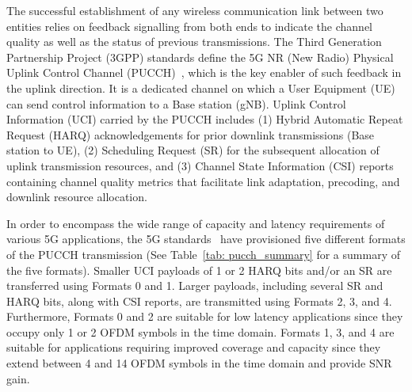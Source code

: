 \documentclass[journal]{IEEEtran}
\begin{document}
The successful establishment of any wireless communication link between two entities relies on feedback signalling from both ends to indicate the channel quality as well as the status of previous transmissions. The Third Generation Partnership Project (3GPP) standards define the 5G NR (New Radio) Physical Uplink Control Channel (PUCCH)~\cite{5g_bullets}, which is the key enabler of such feedback in the uplink direction. It is a dedicated channel on which a User Equipment (UE) can send control information to a Base station (gNB). Uplink Control Information (UCI) carried by the PUCCH includes (1) Hybrid Automatic Repeat Request (HARQ) acknowledgements for prior downlink transmissions (Base station to UE), (2) Scheduling Request (SR) for the subsequent allocation of uplink transmission resources, and (3) Channel State Information (CSI) reports containing channel quality metrics that facilitate link adaptation, precoding, and downlink resource allocation. 

In order to encompass the wide range of capacity and latency requirements of various 5G applications, the 5G standards~\cite{3gpp_38_211, 3gpp_38_212, 3gpp_38_213} have provisioned five different formats of the PUCCH transmission (See Table~\ref{tab: pucch_summary} for a summary of the five formats). Smaller UCI payloads of 1 or 2 HARQ bits and/or an SR are transferred using Formats 0 and 1. Larger payloads, including several SR and HARQ bits, along with CSI reports, are transmitted using Formats 2, 3, and 4. Furthermore, Formats 0 and 2 are suitable for low latency applications since they occupy only 1 or 2 OFDM symbols in the time domain. Formats 1, 3, and 4 are suitable for applications requiring improved coverage and capacity since they extend between 4 and 14 OFDM symbols in the time domain and provide SNR gain. 
\end{document}
